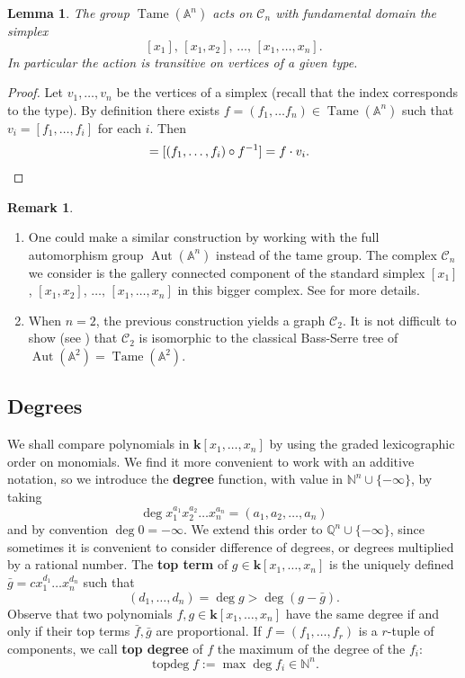\documentclass[reqno,oneside,11pt]{amsart}
\theoremstyle{plain}
\newtheorem{lemma}[theorem]{Lemma}
\theoremstyle{definition}
\newtheorem{remark}[theorem]{Remark}
\newcommand{\Q}{\mathbb{Q}}
\newcommand{\N}{\mathbb{N}}
\newcommand{\A}{{\mathbb{A}}}
\newcommand{\K}{\mathbf{k}}
\DeclareMathOperator{\Aut}{Aut}
\DeclareMathOperator{\topdeg}{topdeg}
\DeclareMathOperator{\Tame}{Tame}
\newcommand{\Comp}{\mathcal{C}}
\begin{document}
\begin{lemma}
The group $\Tame(\A^n)$ acts on $\Comp_n$ with fundamental domain the simplex
$$[x_1],\, [x_1, x_2],\, \dots,\, [x_1, \dots, x_n].$$
In particular the action is transitive on vertices of a given type.
\end{lemma}

\begin{proof}
Let $v_1, \dots, v_n$ be the vertices of a simplex (recall that the index corresponds to the type).
By definition there exists $f =(f_1, \dots f_n) \in \Tame(\A^n)$ such that $v_i = [f_1, \dots, f_i]$ for each $i$.
Then
\begin{align*}
[x_1, \dots, x_i] &= [(f_1, \dots, f_i ) \circ f^{-1}] = f\cdot v_i. \qedhere
\end{align*}
\end{proof}

\begin{remark}
\begin{enumerate}[wide]
\item
One could make a similar construction by working with the full automorphism group $\Aut(\A^n)$ instead of the tame group.
The complex $\Comp_n$ we consider is the gallery connected component of the standard simplex
$[x_1]$, $[x_1, x_2]$, $\dots,\, [x_1, \dots, x_n]$
in this bigger complex.
See \cite[\S 6.2.1]{BFL} for more details.
\item
When $n = 2$, the previous construction yields a graph $\Comp_2$.
It is not difficult to show (see \cite[\S 2.5.2]{BFL}) that $\Comp_2$ is isomorphic to the classical  Bass-Serre tree of $\Aut(\A^2) = \Tame(\A^2)$.
\end{enumerate}
\end{remark}

\subsection{Degrees} \label{sec:degrees}

We shall compare polynomials in $\K[x_1, \dots,x_n]$ by using the graded lexicographic order on monomials.
We find it more convenient to work with an additive notation, so we introduce the \textbf{degree} function, with value in $\N^n \cup \{-\infty\}$, by taking
$$\deg x_1^{a_1} x_2^{a_2} \dots x_n^{a_n} = (a_1, a_2, \dots, a_n)$$
and by convention $\deg 0 = -\infty$.
We extend this order to $\Q^n \cup \{-\infty\}$, since sometimes it is convenient to consider difference of degrees, or degrees multiplied by a rational number.
The \textbf{top term} of $g \in \K[x_1,\dots,x_n]$ is the uniquely defined $\bar g = c x_1^{d_1}\dots x_n^{d_n}$ such that
$$(d_1,\dots,d_n) = \deg g  > \deg (g - \bar g).$$
Observe that two polynomials $f,g \in \K[x_1,\dots,x_n]$ have the same degree if and only if their top terms $\bar f, \bar g$ are proportional. 
If $f = (f_1, \dots, f_r)$ is a $r$-tuple of components,
we call \textbf{top degree} of $f$ the maximum of the degree of the $f_i$:
$$\topdeg f := \max \deg f_i \in \N^n.$$
\end{document}

